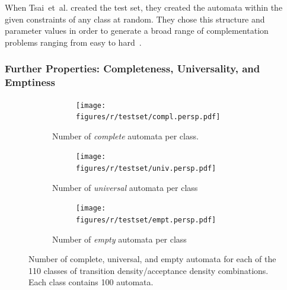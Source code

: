 When Tsai~et~al. created the \goal{} test set, they created the automata within the given constraints of any class at random. They chose this structure and parameter values in order to generate a broad range of complementation problems ranging from easy to hard~\cite{2011_tsai}.


\subsubsection{Further Properties: Completeness, Universality, and Emptiness}

\renewcommand{\tabcolsep}{0.05cm}   %
\renewcommand{\arraystretch}{1.05}
\begin{figure}[htb!]
  \centering
  \begin{subfigure}{\textwidth}
    \begin{subtable}{0.47\textwidth}
    
    \end{subtable}
    \hfill
    \begin{subfigure}{0.52\textwidth}
    \texttt{[image: figures/r/testset/compl.persp.pdf]}
    \end{subfigure}
  \caption{Number of \textit{complete} automata per class.}
  \end{subfigure}

 \begin{subfigure}{\textwidth}
    \begin{subtable}{0.47\textwidth}
    
    \end{subtable}
    \hfill
    \begin{subfigure}{0.52\textwidth}
    \texttt{[image: figures/r/testset/univ.persp.pdf]}
    \end{subfigure}
  \caption{Number of \textit{universal} automata per class}
  \end{subfigure}

  \begin{subfigure}{\textwidth}
    \begin{subtable}{0.47\textwidth}
    
    \end{subtable}
    \hfill
    \begin{subfigure}{0.52\textwidth}
    \texttt{[image: figures/r/testset/empt.persp.pdf]}
    \end{subfigure}
  \caption{Number of \textit{empty} automata per class}
  \end{subfigure}
\caption{Number of complete, universal, and empty automata for each of the 110 classes of transition density/acceptance density combinations. Each class contains 100 automata.}
\label{testset_analysis}
\end{figure}
\tablestyle  %

